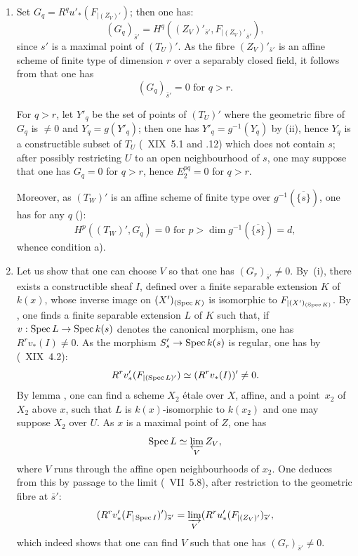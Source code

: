 \begin{enumerate}
\item[$1^\circ)$]
Set $G_q = R^q u'_*(F_{|(Z_V)'})$; then one has:
$$(G_q)_{\bar{s}'}=H^q((Z_V)'_{\bar{s}'}, F{_{|(Z_V)'}}_{\bar{s}'}),
$$
since $s'$ is a maximal point of $(T_U)'$. As the fibre $(Z_V)'_{\bar{s}'}$ is an affine scheme of finite type of dimension $r$ over a separably closed field, it follows from  that one has
$$(G_q)_{\bar{s}'}=0 \text{ for } q>r.
$$

For $q>r$, let $Y'_q$ be the set of points of $(T_U)'$ where the geometric fibre of $G_q$ is $\neq 0$ and $Y_q=g(Y'_q)$; then one has $Y'_q = g^{-1}(Y_q)$ by \textup{(ii)}, hence $Y_q$ is a constructible subset of $T_U$ (~XIX~5.1 and .12) which does not contain $s$; after possibly restricting $U$ to an open neighbourhood of $s$, one may suppose that one has $G_q=0$ for $q>r$, hence $E_2^{pq}=0$ for $q>r$.

Moreover, as $(T_W)'$ is an affine scheme of finite type over $g^{-1}(\overline{\{s\}})$, one has for any $q$ (\cf {}):
$$H^p((T_W)', G_q)=0 \text{ for } p>\dim g^{-1}(\overline{\{s\}})=d,
$$
whence condition a).

\item[$2^\circ)$]
Let us show that one can choose $V$ so that one has $(G_r)_{\bar{s}'} \neq 0$. By~\textup{(i)}, there exists a constructible sheaf $I$, defined over a finite separable extension $K$ of $k(x)$, whose inverse image on $(X')_{(\operatorname{Spec} K)}$ is isomorphic to $F_{|(X')_{(\operatorname{Spec} K)}}$. By , one finds a finite separable extension $L$ of $K$ such that, if $v:\Spec L \to \Spec k(s)$ denotes the canonical morphism, one has $R^r v_*(I) \neq 0$. As the morphism $S'_s \to \Spec k(s)$ is regular, one has by (~XIX~4.2):
$$R^rv_*'(F_{|(\operatorname{Spec} L)'}) \simeq (R^rv_*(I))' \neq 0.
$$
By lemma , one can find a scheme $X_2$ \'etale over $X$, affine, and a point~$x_2$ of $X_2$ above $x$, such that $L$ is $k(x)$-isomorphic to $k(x_2)$ and one may suppose $X_2$ over $U$. As $x$ is a maximal point of $Z$, one has
$$
\operatorname{Spec} L \simeq \varprojlim_V Z_V,
$$
where $V$ runs through the affine open neighbourhoods of $x_2$. One deduces from this by passage to the limit (~VII~5.8), after restriction to the geometric fibre at $\bar{s}'$:
$$
(R^rv_*'(F_{|\operatorname{Spec} I})')_{\overline{s}'} = \varinjlim_V (R^ru_*'(F_{|(Z_V)'})_{\overline{s}'},
$$
which indeed shows that one can find $V$ such that one has $(G_r)_{\bar{s}'} \neq 0$.


\end{enumerate}
